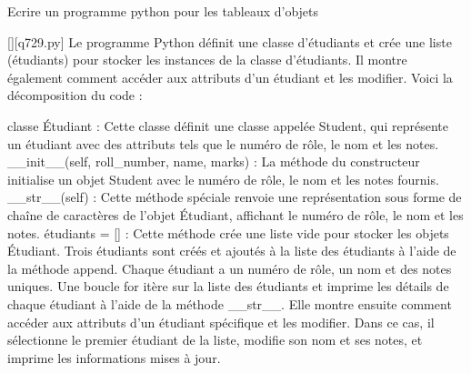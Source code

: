         \question
        Ecrire un programme python pour les tableaux d'objets
        \par
        \begin{solution}
            \renewcommand{\nomfichier}{q729.py}
            \pythonfile{\chemincode \nomfichier}[][\nomfichier]
            Le programme Python définit une classe d'étudiants et crée une liste (étudiants) pour stocker les instances de la classe d'étudiants. Il montre également comment accéder aux attributs d'un étudiant et les modifier. Voici la décomposition du code :

    classe Étudiant : Cette classe définit une classe appelée Student, qui représente un étudiant avec des attributs tels que le numéro de rôle, le nom et les notes.
    \_\_init\_\_(self, roll\_number, name, marks) : La méthode du constructeur initialise un objet Student avec le numéro de rôle, le nom et les notes fournis.
    \_\_str\_\_(self) : Cette méthode spéciale renvoie une représentation sous forme de chaîne de caractères de l'objet Étudiant, affichant le numéro de rôle, le nom et les notes.
    étudiants = [] : Cette méthode crée une liste vide pour stocker les objets Étudiant.
    Trois étudiants sont créés et ajoutés à la liste des étudiants à l'aide de la méthode append. Chaque étudiant a un numéro de rôle, un nom et des notes uniques.
    Une boucle for itère sur la liste des étudiants et imprime les détails de chaque étudiant à l'aide de la méthode \_\_str\_\_.
    Elle montre ensuite comment accéder aux attributs d'un étudiant spécifique et les modifier. Dans ce cas, il sélectionne le premier étudiant de la liste, modifie son nom et ses notes, et imprime les informations mises à jour.
        \end{solution}
        

